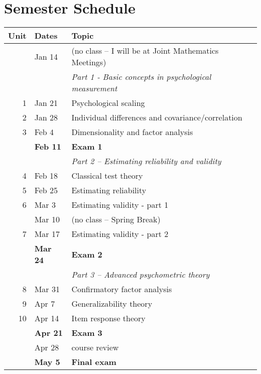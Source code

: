 \documentclass[10pt]{article}
\begin{document}
\section*{Semester Schedule}
\label{sec:org1963cef}
\begin{center}
\begin{tabular}{rll}
Unit & Dates & Topic\\
\hline
 & Jan 14 & (no class -- I will be at Joint Mathematics Meetings)\\
 &  & \emph{Part 1 - Basic concepts in psychological measurement}\\
1 & Jan 21 & Psychological scaling\\
2 & Jan 28 & Individual differences and covariance/correlation\\
3 & Feb 4 & Dimensionality and factor analysis\\
 & \textbf{Feb 11} & \textbf{Exam 1}\\
\hline
 &  & \emph{Part 2 -- Estimating reliability and validity}\\
4 & Feb 18 & Classical test theory\\
5 & Feb 25 & Estimating reliability\\
6 & Mar 3 & Estimating validity - part 1\\
 & Mar 10 & (no class -- Spring Break)\\
7 & Mar 17 & Estimating validity - part 2\\
 & \textbf{Mar 24} & \textbf{Exam 2}\\
\hline
 &  & \emph{Part 3 -- Advanced psychometric theory}\\
8 & Mar 31 & Confirmatory factor analysis\\
9 & Apr 7 & Generalizability theory\\
10 & Apr 14 & Item response theory\\
 & \textbf{Apr 21} & \textbf{Exam 3}\\
 & Apr 28 & course review\\
 & \textbf{May 5} & \textbf{Final exam}\\
\hline
\end{tabular}
\end{center}
\end{document}
